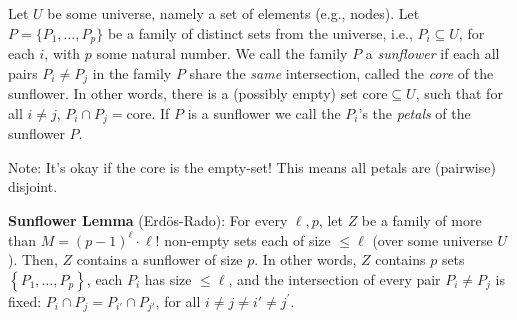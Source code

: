 \begin{svgraybox}
\begin{definition}[Sunflower] Let $U$ be some universe, namely a set of elements (e.g., nodes). Let $P=\{P_1,\dots,P_p\}$ be a family of distinct sets from the universe, i.e., $P_i\subseteq U$, for each $i$, with $p$ some natural number. 
We call the family $P$ a \emph{sunflower} if each all pairs $P_i \neq P_j$ in the family $P$ share the \emph{same} intersection, called the \emph{core} of the sunflower.
In other words, there is a (possibly empty) set $\mathrm{core}\subseteq U$, such that for all $i\neq j$,  $ P_i\cap P_j = \mathrm{core}$.
If $P$ is a sunflower we call the $P_i$'s the \emph{petals} of the sunflower $P$.
\end{definition}
\end{svgraybox}
Note: It's okay if the core is the empty-set! This means all petals are (pairwise) disjoint.


\begin{svgraybox}
\textbf{Sunflower Lemma} (Erd\"os-Rado): For every $\ell, p$, let $Z$ be a family of more than $M=(p-1)^\ell \cdot \ell!$ non-empty sets each of size $\leqslant \ell$ (over some universe $U$). Then, $Z$ contains a sunflower of size $p$. In other words, $Z$ contains $p$ sets $\left\{P_1, \ldots, P_p\right\}$, each $P_i$ has size $\leqslant \ell$, and the intersection of every pair $P_i \neq P_j$ is fixed: $P_i \cap P_j=P_{i'} \cap P_{j'}$, for all $i \neq j \neq i' \neq j^{\prime}$.
\end{svgraybox}



